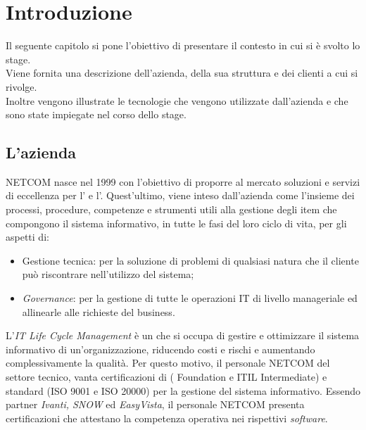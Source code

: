 \chapter{Introduzione}
\label{introduction}
Il seguente capitolo si pone l'obiettivo di presentare il contesto in cui si è svolto lo stage. \\
Viene fornita una descrizione dell’azienda, della sua struttura e dei clienti a cui si rivolge. \\
Inoltre vengono illustrate le tecnologie che vengono utilizzate dall'azienda e che sono state impiegate nel corso dello stage.

\section{L'azienda}
NETCOM nasce nel 1999 con l’obiettivo di proporre al mercato soluzioni e servizi di eccellenza per l’ e l’. Quest’ultimo, viene inteso dall’azienda come l’insieme dei processi, procedure, competenze e strumenti utili alla gestione degli item che compongono il sistema informativo, in tutte le fasi del loro ciclo di vita, per gli aspetti di:
\begin{itemize}
    \item Gestione tecnica: per la soluzione di problemi di qualsiasi natura che il cliente può riscontrare nell’utilizzo del sistema;
    \item \emph{Governance}: per la gestione di tutte le operazioni IT di livello manageriale ed allinearle alle richieste del business.
\end{itemize}

L'\emph{IT Life Cycle Management} è un  che si occupa di gestire e ottimizzare il sistema informativo di un'organizzazione, riducendo costi e rischi e aumentando complessivamente la qualità. Per questo motivo, il personale NETCOM del settore tecnico, vanta certificazioni di (  Foundation e ITIL Intermediate) e standard (ISO 9001 e ISO 20000) per la gestione del sistema informativo.  Essendo partner \emph{Ivanti, SNOW} ed \emph{EasyVista}, il personale NETCOM presenta certificazioni che attestano la competenza operativa nei rispettivi \emph{software}. \cite{itil-pro} \\


